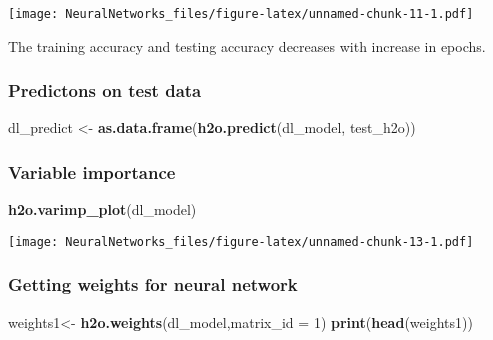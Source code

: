 \documentclass[]{article}
\newenvironment{Shaded}{\begin{snugshade}}{\end{snugshade}}
\newcommand{\KeywordTok}[1]{\textcolor[rgb]{0.13,0.29,0.53}{\textbf{#1}}}
\newcommand{\DataTypeTok}[1]{\textcolor[rgb]{0.13,0.29,0.53}{#1}}
\newcommand{\DecValTok}[1]{\textcolor[rgb]{0.00,0.00,0.81}{#1}}
\newcommand{\StringTok}[1]{\textcolor[rgb]{0.31,0.60,0.02}{#1}}
\newcommand{\NormalTok}[1]{#1}
\begin{document}
\texttt{[image: NeuralNetworks\_files/figure-latex/unnamed-chunk-11-1.pdf]}

The training accuracy and testing accuracy decreases with increase in
epochs.

\subsubsection{Predictons on test data}\label{predictons-on-test-data}

\begin{Shaded}
\begin{Highlighting}[]
\NormalTok{dl_predict <-}\StringTok{ }\KeywordTok{as.data.frame}\NormalTok{(}\KeywordTok{h2o.predict}\NormalTok{(dl_model, test_h2o))}
\end{Highlighting}
\end{Shaded}

\subsubsection{Variable importance}\label{variable-importance}

\begin{Shaded}
\begin{Highlighting}[]
\KeywordTok{h2o.varimp_plot}\NormalTok{(dl_model)}
\end{Highlighting}
\end{Shaded}

\texttt{[image: NeuralNetworks\_files/figure-latex/unnamed-chunk-13-1.pdf]}

\subsubsection{Getting weights for neural
network}\label{getting-weights-for-neural-network}

\begin{Shaded}
\begin{Highlighting}[]
\NormalTok{weights1<-}\StringTok{ }\KeywordTok{h2o.weights}\NormalTok{(dl_model,}\DataTypeTok{matrix_id =} \DecValTok{1}\NormalTok{)}
\KeywordTok{print}\NormalTok{(}\KeywordTok{head}\NormalTok{(weights1))}
\end{Highlighting}
\end{Shaded}
\end{document}
